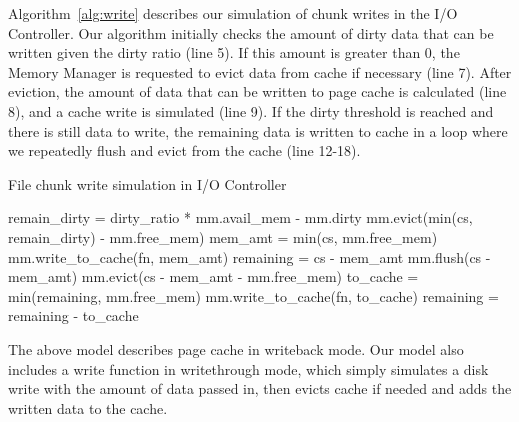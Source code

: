 Algorithm~\ref{alg:write} describes our simulation of chunk writes in
the I/O Controller.
Our algorithm initially checks the  amount of dirty data that
can be written given the dirty ratio (line 5).
If this amount is greater than 0, the Memory Manager is requested to evict
data from cache if necessary (line 7).
After eviction, the amount of data that can be written to
page cache is calculated (line 8), and a cache write is simulated (line 9).
If the dirty threshold is reached and there is still data to write,
the remaining data is written to cache in a loop
where we repeatedly flush and evict from the cache (line 12-18).

\begin{algorithm}[H]
\caption{File chunk write simulation in I/O Controller}
\label{alg:write}
    \small
    \begin{algorithmic}[1]
        \Input
           \EndInput
        \State remain\_dirty = dirty\_ratio * mm.avail\_mem - mm.dirty
         
            \State mm.evict(min(cs, remain\_dirty) - mm.free\_mem)
            \State mem\_amt = min(cs, mm.free\_mem)
            \State mm.write\_to\_cache(fn, mem\_amt)
        \EndIf
        \State remaining = cs - mem\_amt
          
            \State mm.flush(cs - mem\_amt)
            \State mm.evict(cs - mem\_amt  - mm.free\_mem)
            \State to\_cache = min(remaining, mm.free\_mem)
            \State mm.write\_to\_cache(fn, to\_cache)
            \State remaining = remaining - to\_cache
        \EndWhile

    \end{algorithmic}
\end{algorithm}

The above model describes page cache in writeback
mode. Our model also includes a write function in writethrough mode,
which simply simulates a disk write with the amount of data passed in,
then evicts cache if needed and adds the written data to the cache.